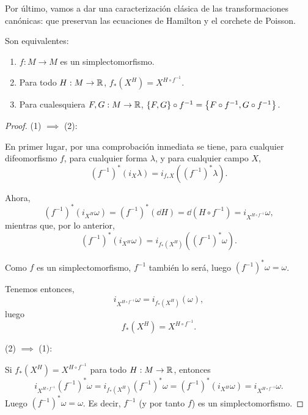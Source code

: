 Por último, vamos a dar una caracterización clásica de las transformaciones canónicas: que preservan las ecuaciones de Hamilton y el corchete de Poisson.
\begin{prop}
  Son equivalentes:
  \begin{enumerate}
    \item $f:M\rightarrow M$ es un simplectomorfismo.
    \item Para todo $H: M \rightarrow \mathbb{R}$, $f_*(X^H)=X^{H\circ f^{-1}}$.
    \item Para cualesquiera $F,G: M \rightarrow \mathbb{R}$, $\left\lbrace F,G\right\rbrace \circ f^{-1}=\left\lbrace F\circ f^{-1},G \circ f^{-1}\right\rbrace$.
  \end{enumerate}
\end{prop}
\begin{proof}\leavevmode
  
  (1) $\implies$ (2):

  En primer lugar, por una comprobación inmediata  se tiene, para cualquier difeomorfismo $f$, para cualquier forma $\lambda$, y para cualquier campo $X$, 
  \begin{equation*}
    (f^{-1})^*(i_X \lambda) = i_{f_*X}((f^{-1})^* \lambda).
  \end{equation*}

  Ahora,
  \begin{equation*}
    (f^{-1})^*(i_{X^H}\omega)=(f^{-1})^*(\dd H)=\dd(H\circ f^{-1})=i_{X^{H \circ f^{-1}}}\omega,
  \end{equation*}
  mientras que, por lo anterior,
  \begin{equation*}
    (f^{-1})^*(i_{X^H}\omega)=i_{f_*(X^H)}( (f^{-1})^*\omega).
  \end{equation*}

  Como $f$ es un simplectomorfismo, $f^{-1}$ también lo será, luego $(f^{-1})^* \omega = \omega$.

  Tenemos entonces,
  \begin{equation*}
    i_{X^{H \circ f^{-1}}} \omega = i_{f_*(X^H)}(\omega),
  \end{equation*}
  luego 
  \begin{equation*}
    f_*(X^H)=X^{H \circ f^{-1}}.
  \end{equation*}

  (2) $\implies$ (1):

  Si $f_*(X^H)=X^{H \circ f^{-1}}$ para todo $H:M \rightarrow \mathbb{R}$, entonces
  \begin{equation*}
    i_{X^{H\circ f^{-1}}}(f^{-1})^* \omega=i_{f_*(X^H)}(f^{-1})^* \omega = (f^{-1})^*(i_{X^H}\omega)=i_{X^{H \circ f^{-1}}}\omega.
  \end{equation*}
  Luego $(f^{-1})^* \omega = \omega$. Es decir, $f^{-1}$ (y por tanto $f$) es un simplectomorfismo.


\end{proof}
